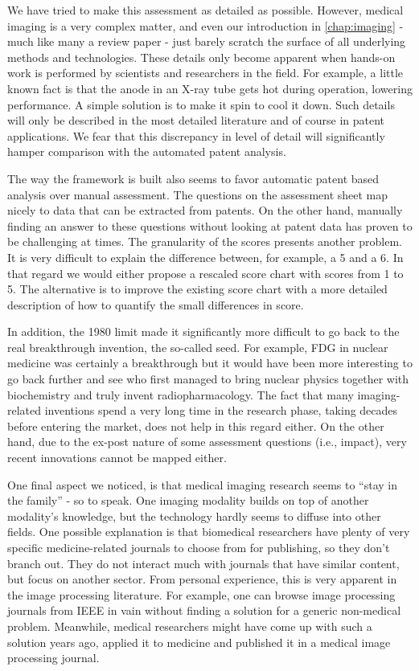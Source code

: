We have tried to make this assessment as detailed as possible. However, medical
imaging is a very complex matter, and even our introduction in
\autoref{chap:imaging} - much like many a review paper - just barely scratch the
surface of all underlying methods and technologies. These details only become
apparent when hands-on work is performed by scientists and researchers in the
field. For example, a little known fact is that the anode in an X-ray tube gets
hot during operation, lowering performance. A simple solution is to make it spin
to cool it down. Such details will only be described in the most detailed
literature and of course in patent applications. We fear that this discrepancy
in level of detail will significantly hamper comparison with the automated
patent analysis.

The way the framework is built also seems to favor automatic patent based
analysis over manual assessment. The questions on the assessment sheet map
nicely to data that can be extracted from patents. On the other hand, manually
finding an answer to these questions without looking at patent data has proven
to be challenging at times. The granularity of the scores presents another
problem. It is very difficult to explain the difference between, for example, a
5 and a 6. In that regard we would either propose a rescaled score chart with
scores from 1 to 5. The alternative is to improve the existing score chart with a more
detailed description of how to quantify the small differences in score.

In addition, the 1980 limit made it significantly more difficult to go back to
the real breakthrough invention, the so-called seed. For example, FDG in nuclear
medicine was certainly a breakthrough but it would have been more interesting to
go back further and see who first managed to bring nuclear physics together with
biochemistry and truly invent radiopharmacology. The fact that many
imaging-related inventions spend a very long time in the research phase, taking
decades before entering the market, does not help in this regard either. On the
other hand, due to the ex-post nature of some assessment questions (i.e.,
impact), very recent innovations cannot be mapped either.

One final aspect we noticed, is that medical imaging research seems to ``stay in
the family'' - so to speak. One imaging modality builds on top of another
modality's knowledge, but the technology hardly seems to diffuse into other
fields. One possible explanation is that biomedical researchers have plenty of
very specific medicine-related journals to choose from for publishing, so they
don't branch out. They do not interact much with journals that have similar
content, but focus on another sector. From personal experience, this is very
apparent in the image processing literature. For example, one can browse image
processing journals from IEEE in vain without finding a solution for a generic
non-medical problem. Meanwhile, medical researchers might have come up with such
a solution years ago, applied it to medicine and published it in a medical image
processing journal.